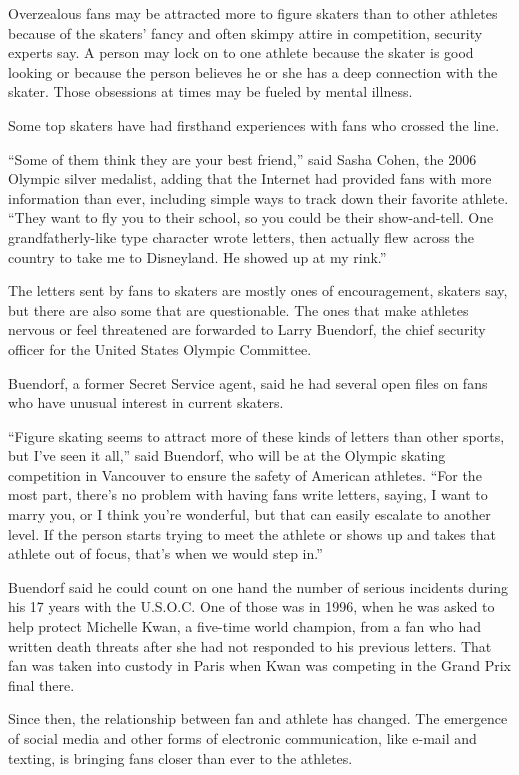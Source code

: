﻿\documentclass[12pt]{article}
\begin{document}
Overzealous fans may be attracted more to figure skaters than to other athletes because of the
skaters' fancy and often skimpy attire in competition, security experts say. A person may lock on to
one athlete because the skater is good looking or because the person believes he or she has a deep
connection with the skater. Those obsessions at times may be fueled by mental illness.

Some top skaters have had firsthand experiences with fans who crossed the line.

``Some of them think they are your best friend,'' said Sasha Cohen, the 2006 Olympic silver
medalist, adding that the Internet had provided fans with more information than ever, including
simple ways to track down their favorite athlete. ``They want to fly you to their school, so you
could be their show-and-tell. One grandfatherly-like type character wrote letters, then actually
flew across the country to take me to Disneyland. He showed up at my rink.''

The letters sent by fans to skaters are mostly ones of encouragement, skaters say, but there are
also some that are questionable. The ones that make athletes nervous or feel threatened are
forwarded to Larry Buendorf, the chief security officer for the United States Olympic Committee.

Buendorf, a former Secret Service agent, said he had several open files on fans who have unusual
interest in current skaters.

``Figure skating seems to attract more of these kinds of letters than other sports, but I've seen it
all,'' said Buendorf, who will be at the Olympic skating competition in Vancouver to ensure the
safety of American athletes. ``For the most part, there's no problem with having fans write letters,
saying, I want to marry you, or I think you're wonderful, but that can easily escalate to another
level. If the person starts trying to meet the athlete or shows up and takes that athlete out of
focus, that's when we would step in.''

Buendorf said he could count on one hand the number of serious incidents during his 17 years with
the U.S.O.C. One of those was in 1996, when he was asked to help protect Michelle Kwan, a five-time
world champion, from a fan who had written death threats after she had not responded to his previous
letters. That fan was taken into custody in Paris when Kwan was competing in the Grand Prix final
there.

Since then, the relationship between fan and athlete has changed. The emergence of social media and
other forms of electronic communication, like e-mail and texting, is bringing fans closer than ever
to the athletes.
\end{document}
